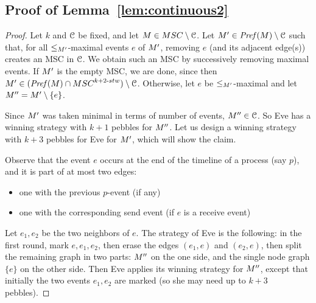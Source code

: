 \documentclass[a4paper,UKenglish,cleveref, autoref, thm-restate]{lipics-v2021}
\begin{document}
\subsection{Proof of Lemma~\ref{lem:continuous2}}
\label{app:continuous2}

\lemcontinuoustwo*

\begin{proof}
	Let $k$ and $\mathcal{C}$ be fixed, and let
	$\msc\in \MSCs\setminus \Class$.
	Let $M'\in \mathit{Pref}(M)\setminus \mathcal{C}$
	such that,
	for all $\le_{M'}$-maximal events $e$ of $M'$, removing $e$ (and its adjacent edge(s)) creates an MSC in $\mathcal{C}$.
	We obtain such an MSC by successively removing maximal events.
	If $M'$ is the empty MSC, we are done, since then
	$\msc'\in (\Pref{\msc}\cap\stwMSCs{k+2})\setminus \Class$.
	Otherwise, let $e$ be $\le_{M'}$-maximal and
	let $M''=M'\setminus\{e\}$.
	

	Since $M'$ was taken minimal in terms of number of events,
	$M''\in \mathcal{C}$.
	So Eve has a winning strategy with $k+1$ pebbles for $M''$.
	Let us design a winning strategy with $k+3$ pebbles for Eve for $M'$, which
	will show the claim.

	Observe that the event $e$ occurs at the end of the timeline of a process (say $p$), and it is part of at most two edges:
	\begin{itemize}
		\item one with the previous $p$-event (if any)
		\item one with the corresponding send event (if $e$ is a receive event)
	\end{itemize}
	Let $e_1,e_2$ be the two neighbors of $e$.
	The strategy of Eve is the following: in the first round, mark $e,e_1,e_2$,
	then erase the edges $(e_1,e)$ and $(e_2,e)$, then split the remaining graph
	in two parts: $M''$ on the one side, and the single node graph $\{e\}$ on
	the other side. Then Eve applies its winning strategy for $M''$, except
	that initially the two events $e_1,e_2$ are marked (so she may need up to $k+3$
	pebbles).
\end{proof}
\end{document}
